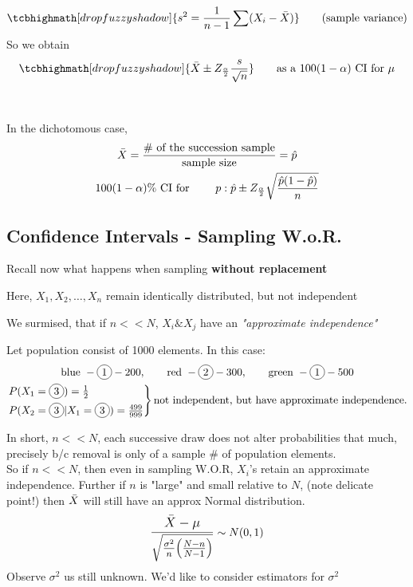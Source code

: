 \begin{gather*}
	\tcbhighmath[drop fuzzy shadow]{s^2 = \frac{1}{n-1} \sum(X_i - \bX)} \tag{sample variance}
\end{gather*}
So we obtain 
\begin{gather*}
	\tcbhighmath[drop fuzzy shadow]{\bX \pm Z_{\frac{\alpha}{2}} \frac{s}{\sqrt{n}}} \qquad \text{as a $100(1-\alpha)$ CI for $\mu$}
\end{gather*}
\redhline\\\\
In the dichotomous case, 
\begin{gather*}
	\bar{X} = \frac{\text{\# of the succession sample}}{\text{sample size}} = \hat{p}\\
	100(1-\alpha)\% \text{ CI for } \qquad p: \hat{p} \pm Z_{\frac{\alpha}{2}} \sqrt{\frac{\hat{p}(1-\hat{p})}{n}}
\end{gather*}
\subsection*{Confidence Intervals - Sampling W.o.R.}
Recall now what happens when sampling \textbf{without replacement}
\begin{center}
	Here, $X_1, X_2, \ldots, X_n$ remain identically distributed, but not independent
\end{center}
We surmised, that if $n << N$, $X_i \& X_j$ have an \textit{"approximate independence"}
\begin{example-N}
	Let population consist of 1000 elements. In this case:
	\begin{gather*}
		\text{blue } - \circled{1} - 200, \qquad \text{red } - \circled{2} - 300, \qquad \text{green } - \circled{1} - 500\\
		\begin{rcases}
		P(X_1 = \circled{3}) = \frac{1}{2}\\
		P(X_2 = \circled{3} | X_1 = \circled{3}) = \frac{499}{999}
		\end{rcases} \text{not independent, but have approximate independence.}
	\end{gather*}
\end{example-N}
In short, $n << N$, each successive draw does not alter probabilities that much, precisely b/c removal is only of a sample \# of population elements.\\
So if $n << N$, then even in sampling W.O.R, $X_i$'s retain an approximate independence. Further if $n$ is "large" and small relative to $N$, (note delicate point!) then $\bar{X}$ will still have an approx Normal distribution.
\begin{gather*}
	\mathlarger{\frac{\bX - \mu}{\sqrt{\frac{\sigma^2}{n} \big(\frac{N-n}{N-1} \big)}}} \sim N(0,1)
\end{gather*}
Observe $\sigma^2$ us still unknown. We'd like to consider estimators for $\sigma^2$
